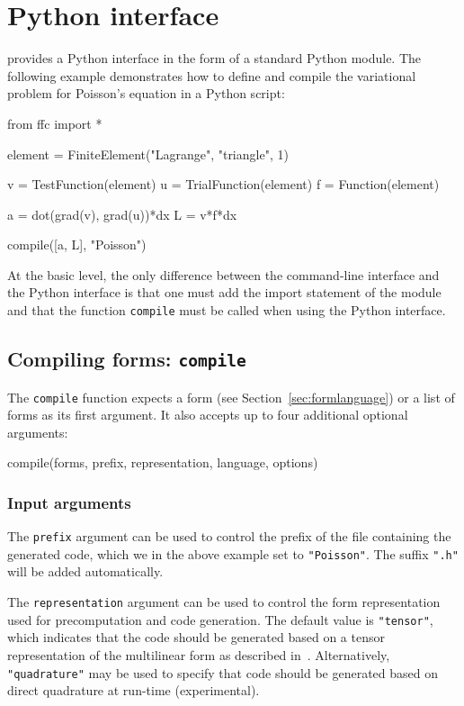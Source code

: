 \chapter{Python interface}

\ffc{} provides a Python interface in the form of a standard
Python module. The following example demonstrates how to define and
compile the variational problem for Poisson's equation in a Python
script:

\begin{code}
from ffc import *

element = FiniteElement("Lagrange", "triangle", 1)

v = TestFunction(element)
u = TrialFunction(element)
f = Function(element)

a = dot(grad(v), grad(u))*dx
L = v*f*dx

compile([a, L], "Poisson")
\end{code}

At the basic level, the only difference between the command-line
interface and the Python interface is that one must add the
import statement of the \ffc{} module and that the function
\texttt{compile} must be called when using the Python interface.

\section{Compiling forms: \texttt{compile}}

The \texttt{compile} function expects a form (see
Section~\ref{sec:formlanguage}) or a list of forms as its first
argument. It also accepts up to four additional optional arguments:
\begin{code}
compile(forms, prefix, representation, language, options)
\end{code}

\subsection{Input arguments}

The \texttt{prefix} argument can be used to control the prefix of the
file containing the generated code, which we in the above example set
to \texttt{"Poisson"}. The suffix \texttt{".h"} will be added
automatically.

The \texttt{representation} argument can be used to control the form
representation used for precomputation and code generation. The
default value is \texttt{"tensor"}, which indicates that the code
should be generated based on a tensor representation of the
multilinear form as described
in~\cite{KirLog06,KirLog07}. Alternatively, \texttt{"quadrature"} may be
used to specify that code should be generated based on direct
quadrature at run-time (experimental).

